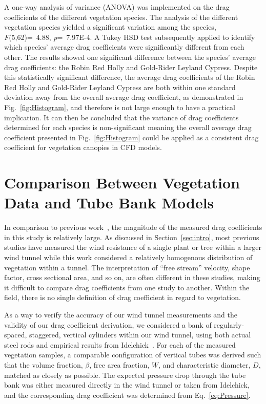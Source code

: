 \documentclass[12pt]{article}
\begin{document}
A one-way analysis of variance (ANOVA) was implemented on the drag coefficients of the different vegetation species. The analysis of the different vegetation species yielded a significant variation among the species, \textit{F}(5,62)=~4.88, \textit{p}=~7.97E-4. A Tukey HSD test subsequently applied to identify which species' average drag coefficients were significantly different from each other. The results showed one significant difference between the species' average drag coefficients: the Robin Red Holly and Gold-Rider Leyland Cypress. Despite this statistically significant difference, the average drag coefficients of the Robin Red Holly and Gold-Rider Leyland Cypress are both within one standard deviation away from the overall average drag coefficient, as demonstrated in Fig.~\ref{fig:Histogram},  and therefore is not large enough to have a practical implication. It can then be concluded that the variance of drag coefficients determined for each species is non-significant meaning the overall average drag coefficient presented in Fig.~\ref{fig:Histogram} could be applied as a consistent drag coefficient for vegetation canopies in CFD models.

\section{Comparison Between Vegetation Data and Tube Bank Models}
\label{sec:comp}

In comparison to previous work~\cite{Cao2012,Jalonen2014,Mayhead1973,Gillies2002,Ishikawa2006}, the magnitude of the measured drag coefficients in this study is relatively large. As discussed in Section~\ref{sec:intro}, most previous studies have measured the wind resistance of a single plant or tree within a larger wind tunnel while this work considered a relatively homogenous distribution of vegetation within a tunnel. The interpretation of ``free stream'' velocity, shape factor, cross sectional area, and so on, are often different in these studies, making it difficult to compare drag coefficients from one study to another. Within the field, there is no single definition of drag coefficient in regard to vegetation.

As a way to verify the accuracy of our wind tunnel measurements and the validity of our drag coefficient derivation, we considered a bank of regularly-spaced, staggered, vertical cylinders within our wind tunnel, using both actual steel rods and empirical results from Idelchick~\cite{Idelchick1994}. For each of the measured vegetation samples, a comparable configuration of vertical tubes was derived such that the volume fraction, $\beta$, free area fraction, $W$, and characteristic diameter, $D$, matched as closely as possible. The expected pressure drop through the tube bank was either measured directly in the wind tunnel or taken from Idelchick, and the corresponding drag coefficient was determined from Eq.~\ref{eq:Pressure}.
\end{document}
